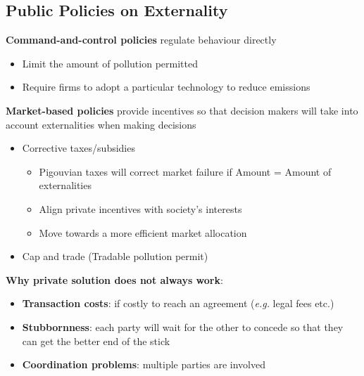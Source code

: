 \documentclass{article}
\newcommand{\eg}[0]{\textit{e.g. }}
\begin{document}
\begin{multicols}{2}
\subsection{Public Policies on Externality}
\textbf{Command-and-control policies} regulate behaviour directly
\begin{itemize}
	\item Limit the amount of pollution permitted
	\item Require firms to adopt a particular technology to reduce emissions
\end{itemize}
\textbf{Market-based policies} provide incentives so that decision makers will take into account externalities when making decisions
\begin{itemize}
	\item Corrective taxes/subsidies
	\begin{itemize}
		\item Pigouvian taxes will correct market failure if Amount = Amount of externalities
		\item Align private incentives with society's interests
		\item Move towards a more efficient market allocation
	\end{itemize}
	\item Cap and trade (Tradable pollution permit)
\end{itemize}
\vspace{1em}
\vspace{1em}

\textbf{Why private solution does not always work}:
\begin{itemize}
	\item \textbf{Transaction costs}: if costly to reach an agreement (\eg legal fees etc.)
	\item \textbf{Stubbornness}: each party will wait for the other to concede so that they can get the better end of the stick
	\item \textbf{Coordination problems}: multiple parties are involved
\end{itemize}

\end{multicols}
\end{document}
